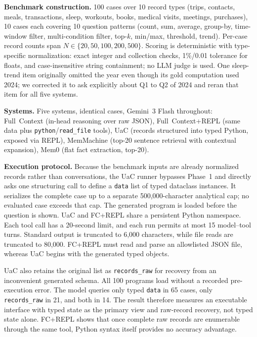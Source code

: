 \textbf{Benchmark construction.} 100 cases over 10 record types (trips, contacts, meals, transactions, sleep, workouts, books, medical visits, meetings, purchases), 10 cases each covering 10 question patterns (count, sum, average, group-by, time-window filter, multi-condition filter, top-$k$, min/max, threshold, trend). Per-case record counts span $N \in \{20, 50, 100, 200, 500\}$. Scoring is deterministic with type-specific normalization: exact integer and collection checks, 1\%/0.01 tolerance for floats, and case-insensitive string containment; no LLM judge is used. One sleep-trend item originally omitted the year even though its gold computation used 2024; we corrected it to ask explicitly about Q1 to Q2 of 2024 and reran that item for all five systems.

\textbf{Systems.} Five systems, identical cases, Gemini~3 Flash throughout: Full~Context (in-head reasoning over raw JSON), Full~Context+REPL (same data plus \texttt{python}/\texttt{read\_file} tools), UaC (records structured into typed Python, exposed via REPL), MemMachine (top-20 sentence retrieval with contextual expansion), Mem0 (flat fact extraction, top-20).

\textbf{Execution protocol.} Because the benchmark inputs are already normalized records rather than conversations, the UaC runner bypasses Phase~1 and directly asks one structuring call to define a \texttt{data} list of typed dataclass instances. It serializes the complete case up to a separate 500{,}000-character analytical cap; no evaluated case exceeds that cap. The generated program is loaded before the question is shown. UaC and FC+REPL share a persistent Python namespace. Each tool call has a 20-second limit, and each run permits at most 15 model--tool turns. Standard output is truncated to 6,000 characters, while file reads are truncated to 80,000. FC+REPL must read and parse an allowlisted JSON file, whereas UaC begins with the generated typed objects.

UaC also retains the original list as \texttt{records\_raw} for recovery from an inconvenient generated schema. All 100 programs load without a recorded pre-execution error. The model queries only typed \texttt{data} in 65 cases, only \texttt{records\_raw} in 21, and both in 14. The result therefore measures an executable interface with typed state as the primary view and raw-record recovery, not typed state alone. FC+REPL shows that once complete raw records are enumerable through the same tool, Python syntax itself provides no accuracy advantage.

